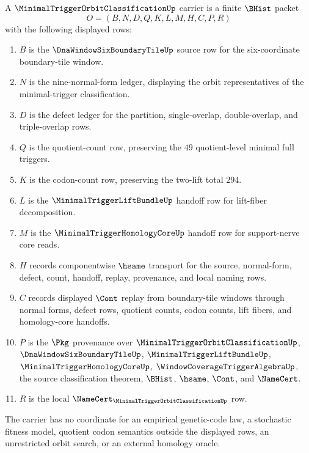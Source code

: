 \begin{definition}
\label{def:minimal-trigger-orbit-classification-carrier}
A $\MinimalTriggerOrbitClassificationUp$ carrier is a finite $\BHist$ packet
$$
O=(B,N,D,Q,K,L,M,H,C,P,R)
$$
with the following displayed rows:
\begin{enumerate}
\item $B$ is the $\DnaWindowSixBoundaryTileUp$ source row for the six-coordinate boundary-tile window.
\item $N$ is the nine-normal-form ledger, displaying the orbit representatives of the minimal-trigger classification.
\item $D$ is the defect ledger for the partition, single-overlap, double-overlap, and triple-overlap rows.
\item $Q$ is the quotient-count row, preserving the $49$ quotient-level minimal full triggers.
\item $K$ is the codon-count row, preserving the two-lift total $294$.
\item $L$ is the $\MinimalTriggerLiftBundleUp$ handoff row for lift-fiber decomposition.
\item $M$ is the $\MinimalTriggerHomologyCoreUp$ handoff row for support-nerve core reads.
\item $H$ records componentwise $\hsame$ transport for the source, normal-form, defect, count, handoff, replay, provenance, and local naming rows.
\item $C$ records displayed $\Cont$ replay from boundary-tile windows through normal forms, defect rows, quotient counts, codon counts, lift fibers, and homology-core handoffs.
\item $P$ is the $\Pkg$ provenance over $\MinimalTriggerOrbitClassificationUp$, $\DnaWindowSixBoundaryTileUp$, $\MinimalTriggerLiftBundleUp$, $\MinimalTriggerHomologyCoreUp$, $\WindowCoverageTriggerAlgebraUp$, the source classification theorem, $\BHist$, $\hsame$, $\Cont$, and $\NameCert$.
\item $R$ is the local $\NameCert_{\MinimalTriggerOrbitClassificationUp}$ row.
\end{enumerate}
The carrier has no coordinate for an empirical genetic-code law, a stochastic fitness model, quotient codon semantics outside the displayed rows, an unrestricted orbit search, or an external homology oracle.
\end{definition}


